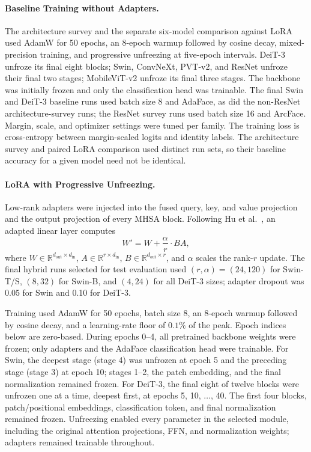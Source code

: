 \documentclass[runningheads,a4paper]{llncs}
\begin{document}
\paragraph{Baseline Training without Adapters.}
The architecture survey and the separate six-model comparison against LoRA used AdamW for 50 epochs, an 8-epoch warmup followed by cosine decay, mixed-precision training, and progressive unfreezing at five-epoch intervals. DeiT-3 unfroze its final eight blocks; Swin, ConvNeXt, PVT-v2, and ResNet unfroze their final two stages; MobileViT-v2 unfroze its final three stages. The backbone was initially frozen and only the classification head was trainable. The final Swin and DeiT-3 baseline runs used batch size 8 and AdaFace, as did the non-ResNet architecture-survey runs; the ResNet survey runs used batch size 16 and ArcFace. Margin, scale, and optimizer settings were tuned per family. The training loss is cross-entropy between margin-scaled logits and identity labels. The architecture survey and paired LoRA comparison used distinct run sets, so their baseline accuracy for a given model need not be identical.

\paragraph{LoRA with Progressive Unfreezing.}
Low-rank adapters were injected into the fused query, key, and value projection and the output projection of every MHSA block. Following Hu et al.~\cite{hu2022lora}, an adapted linear layer computes
\[
W' = W + \frac{\alpha}{r} \cdot BA,
\]
where $W\in\mathbb{R}^{d_{\mathrm{out}}\times d_{\mathrm{in}}}$, $A\in\mathbb{R}^{r\times d_{\mathrm{in}}}$, $B\in\mathbb{R}^{d_{\mathrm{out}}\times r}$, and $\alpha$ scales the rank-$r$ update. The final hybrid runs selected for test evaluation used $(r,\alpha)=(24,120)$ for Swin-T/S, $(8,32)$ for Swin-B, and $(4,24)$ for all DeiT-3 sizes; adapter dropout was 0.05 for Swin and 0.10 for DeiT-3.

Training used AdamW for 50 epochs, batch size 8, an 8-epoch warmup followed by cosine decay, and a learning-rate floor of $0.1\%$ of the peak. Epoch indices below are zero-based. During epochs 0--4, all pretrained backbone weights were frozen; only adapters and the AdaFace classification head were trainable. For Swin, the deepest stage (stage 4) was unfrozen at epoch 5 and the preceding stage (stage 3) at epoch 10; stages 1--2, the patch embedding, and the final normalization remained frozen. For DeiT-3, the final eight of twelve blocks were unfrozen one at a time, deepest first, at epochs 5, 10, $\ldots$, 40. The first four blocks, patch/positional embeddings, classification token, and final normalization remained frozen. Unfreezing enabled every parameter in the selected module, including the original attention projections, FFN, and normalization weights; adapters remained trainable throughout.
\end{document}
